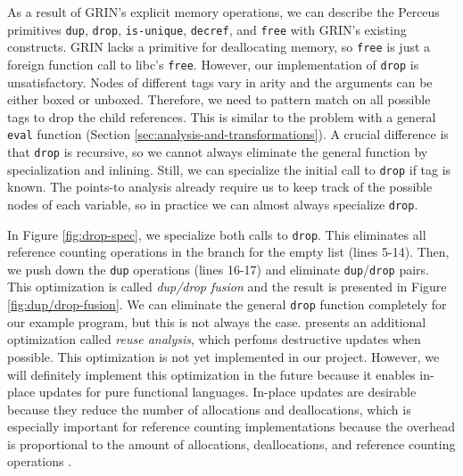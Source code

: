 \documentclass[9pt, twocolumn]{article}
\begin{document}
As a result of GRIN's explicit memory operations, we can describe the Perceus primitives \lstinline{dup}, \lstinline{drop}, \lstinline{is-unique}, \lstinline{decref}, and \lstinline{free} with GRIN's existing constructs.
GRIN lacks a primitive for deallocating memory, so \lstinline{free} is just a foreign function call to libc's \lstinline{free}. 
However, our implementation of \lstinline{drop} is unsatisfactory. 
Nodes of different tags vary in arity and the arguments can be either boxed or unboxed.
Therefore, we need to pattern match on all possible tags to drop the child references. 
This is similar to the problem with a general \lstinline{eval} function (Section \ref{sec:analysis-and-transformations}). 
A crucial difference is that \lstinline{drop} is recursive, so we cannot always eliminate the general function by specialization and inlining.
Still, we can specialize the initial call to \lstinline{drop} if tag is known. 
The points-to analysis already require us to keep track of the possible nodes of each variable, so in practice we can almost always specialize \lstinline{drop}.



In Figure \ref{fig:drop-spec}, we specialize both calls to \lstinline{drop}.
This eliminates all reference counting operations in the branch for the empty list (lines 5-14).
Then, we push down the \lstinline{dup} operations (lines 16-17) and eliminate \lstinline{dup}/\lstinline{drop} pairs.
This optimization is called \emph{dup/drop fusion} and the result is presented in Figure \ref{fig:dup/drop-fusion}.
We can eliminate the general \lstinline{drop} function completely for our example program, but this is not always the case. 
\citeauthor{reinking2021} presents an additional optimization called \emph{reuse analysis}, which perfoms destructive updates when possible.
This optimization is not yet implemented in our project. 
However, we will definitely implement this optimization in the future because it enables in-place updates for pure functional languages.
In-place updates are desirable because they reduce the number of allocations and deallocations, which is especially important for reference counting implementations because the overhead is proportional to the amount of allocations, deallocations, and reference counting operations \citep{wilson1992}.
\end{document}
